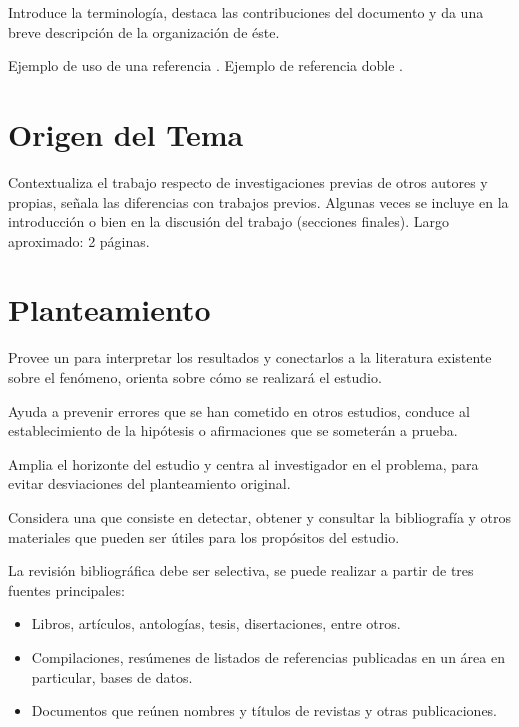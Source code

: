 \documentclass[12pt]{report}
\begin{document}
Introduce la terminología, destaca las contribuciones del documento y da una breve descripción de la organización de éste.

Ejemplo de uso de una referencia \cite{001}. Ejemplo de referencia doble \cite{001,002}.

\section{Origen del Tema}
Contextualiza el trabajo respecto de investigaciones previas de otros autores y propias, señala las diferencias con trabajos previos. Algunas veces se incluye en la introducción o bien en la discusión del trabajo (secciones finales). Largo aproximado: 2 páginas.
\section{Planteamiento}

Provee un  para interpretar los resultados y conectarlos a la literatura existente sobre el fenómeno, orienta sobre cómo se realizará el estudio.

 Ayuda a prevenir errores que se han cometido en otros estudios, conduce al establecimiento de la hipótesis o afirmaciones que se someterán a prueba.
 
 Amplia el horizonte del estudio y centra al investigador en el problema, para evitar desviaciones del planteamiento original.

Considera una  que consiste en detectar, obtener y consultar la bibliografía y otros materiales que pueden ser útiles para los propósitos del estudio.

La revisión bibliográfica debe ser selectiva, se puede realizar a partir de tres fuentes principales:

\begin{itemize}\justifying
  \item {} Libros, artículos, antologías, tesis, disertaciones, entre otros.
  \item {} Compilaciones, resúmenes de listados de referencias publicadas en un área en particular, bases de datos.
  \item {} Documentos que reúnen nombres y títulos de revistas y otras publicaciones.
\end{itemize}


\begin{ejemplo}
\lipsum[1]%
\end{ejemplo} 
\end{document}
